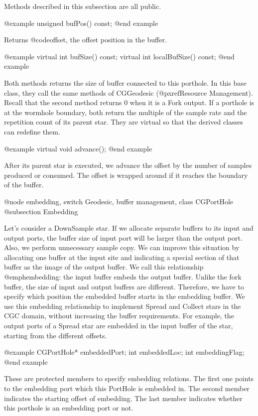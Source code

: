 Methods described in this subsection are all public.

@example
unsigned bufPos() const;
@end example

Returns @code{offset}, the offset position in the buffer.

@example
virtual int bufSize() const;
virtual int localBufSize() const;
@end example

Both methods returns the size of buffer connected to this porthole.
In this base class, they call the same methods of CGGeodesic
(@pxref{Resource Management}). Recall that the second method returns 0
when it is a Fork output. If a porthole is at the wormhole boundary,
both return the multiple of the sample rate and the repetition count of its
parent star. They are virtual so that the derived classes can redefine them.

@example
virtual void advance();
@end example

After its parent star is executed, we advance the offset by the number of
samples produced or consumed. The offset is wrapped around if it reaches
the boundary of the buffer.

@node embedding, switch Geodesic, buffer management, class CGPortHole
@subsection Embedding

Let's consider a DownSample star. If we allocate separate buffers to
its input and output ports, the buffer size of input port will be
larger than the output port. Also, we perform unnecessary sample copy.
We can improve this situation by allocating one buffer at the input site
and indicating a special section of that buffer as the image of the output
buffer. We call this relationship @emph{embedding}: the input buffer
embeds the output buffer. Unlike the fork buffer, the size of input and
output buffers are different. Therefore, we have to specify which position
the embedded buffer starts in the embedding buffer. We use this embedding
relationship to implement Spread and Collect stars in the CGC domain, without
increasing the buffer requirements. For example, the output ports of
a Spread star are embedded in the input buffer of the star, starting from
the different offsets.

@example
CGPortHole* embeddedPort;
int embeddedLoc;
int embeddingFlag;
@end example

These are protected members to specify embedding relations. The first one
points to the embedding port which this PortHole is embedded in. The second
member indicates the starting offset of embedding. The last member indicates
whether this porthole is an embedding port or not.

